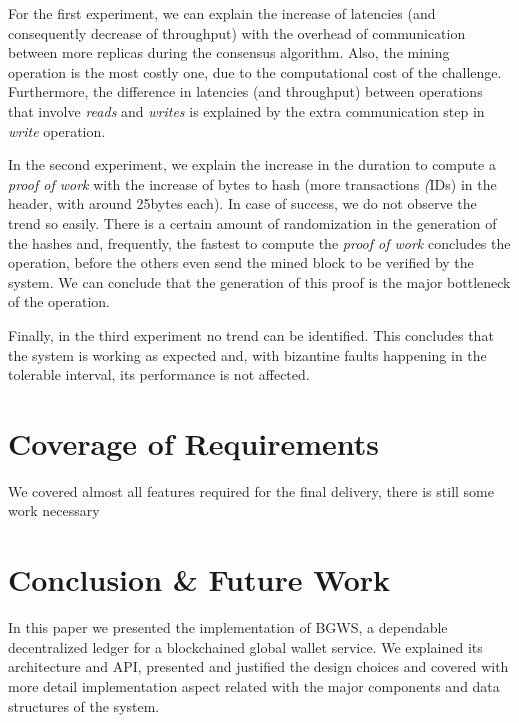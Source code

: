 \documentclass[10pt,journal,compsoc]{IEEEtran}
\begin{document}
	For the first experiment, we can explain the increase of latencies (and consequently decrease of throughput) with the overhead of communication between more replicas during the consensus algorithm. Also, the mining operation is the most costly one, due to the computational cost of the challenge.
	Furthermore, the difference in latencies (and throughput) between operations that involve  \textit{reads} and \textit{writes} is explained by the extra communication step in \textit{write} operation.

	In the second experiment, we explain the increase in the duration to compute a \textit{proof of work} with the increase of bytes to hash (more transactions \textit(IDs) in the header, with around 25bytes each). In case of success, we do not observe the trend so easily. There is a certain amount of randomization in the generation of the hashes and, frequently, the fastest to compute the \textit{proof of work} concludes the operation, before the others even send the mined block to be verified by the system. We can conclude that the generation of this proof is the major bottleneck of the operation.

	Finally, in the third experiment no trend can be identified. This concludes that the system is working as expected and, with bizantine faults happening in the tolerable interval, its performance is not affected.
	
	\section{Coverage of Requirements}
	
	We covered almost all features required for the final delivery, there is still some work necessary 
	
	\section{Conclusion \& Future Work}

	In this paper we presented the implementation of BGWS, a dependable decentralized ledger for a blockchained global wallet service. We explained its architecture and API, presented and justified the design choices and covered with more detail implementation aspect related with the major components and data structures of the system. 
\end{document}
